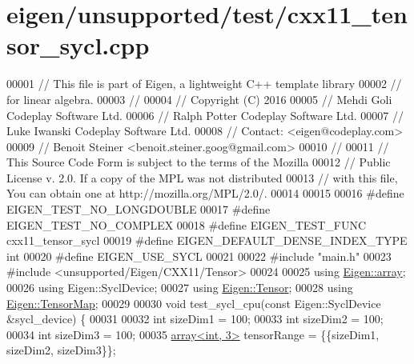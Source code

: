 \hypertarget{eigen_2unsupported_2test_2cxx11__tensor__sycl_8cpp_source}{}\section{eigen/unsupported/test/cxx11\+\_\+tensor\+\_\+sycl.cpp}
\label{eigen_2unsupported_2test_2cxx11__tensor__sycl_8cpp_source}

\begin{DoxyCode}
00001 \textcolor{comment}{// This file is part of Eigen, a lightweight C++ template library}
00002 \textcolor{comment}{// for linear algebra.}
00003 \textcolor{comment}{//}
00004 \textcolor{comment}{// Copyright (C) 2016}
00005 \textcolor{comment}{// Mehdi Goli    Codeplay Software Ltd.}
00006 \textcolor{comment}{// Ralph Potter  Codeplay Software Ltd.}
00007 \textcolor{comment}{// Luke Iwanski  Codeplay Software Ltd.}
00008 \textcolor{comment}{// Contact: <eigen@codeplay.com>}
00009 \textcolor{comment}{// Benoit Steiner <benoit.steiner.goog@gmail.com>}
00010 \textcolor{comment}{//}
00011 \textcolor{comment}{// This Source Code Form is subject to the terms of the Mozilla}
00012 \textcolor{comment}{// Public License v. 2.0. If a copy of the MPL was not distributed}
00013 \textcolor{comment}{// with this file, You can obtain one at http://mozilla.org/MPL/2.0/.}
00014 
00015 
00016 \textcolor{preprocessor}{#define EIGEN\_TEST\_NO\_LONGDOUBLE}
00017 \textcolor{preprocessor}{#define EIGEN\_TEST\_NO\_COMPLEX}
00018 \textcolor{preprocessor}{#define EIGEN\_TEST\_FUNC cxx11\_tensor\_sycl}
00019 \textcolor{preprocessor}{#define EIGEN\_DEFAULT\_DENSE\_INDEX\_TYPE int}
00020 \textcolor{preprocessor}{#define EIGEN\_USE\_SYCL}
00021 
00022 \textcolor{preprocessor}{#include "main.h"}
00023 \textcolor{preprocessor}{#include <unsupported/Eigen/CXX11/Tensor>}
00024 
00025 \textcolor{keyword}{using} \hyperlink{class_eigen_1_1array}{Eigen::array};
00026 \textcolor{keyword}{using} Eigen::SyclDevice;
00027 \textcolor{keyword}{using} \hyperlink{class_eigen_1_1_tensor}{Eigen::Tensor};
00028 \textcolor{keyword}{using} \hyperlink{class_eigen_1_1_tensor_map}{Eigen::TensorMap};
00029 
00030 \textcolor{keywordtype}{void} test\_sycl\_cpu(\textcolor{keyword}{const} Eigen::SyclDevice &sycl\_device) \{
00031 
00032   \textcolor{keywordtype}{int} sizeDim1 = 100;
00033   \textcolor{keywordtype}{int} sizeDim2 = 100;
00034   \textcolor{keywordtype}{int} sizeDim3 = 100;
00035   \hyperlink{class_eigen_1_1array}{array<int, 3>} tensorRange = \{\{sizeDim1, sizeDim2, sizeDim3\}\};

\end{DoxyCode}
